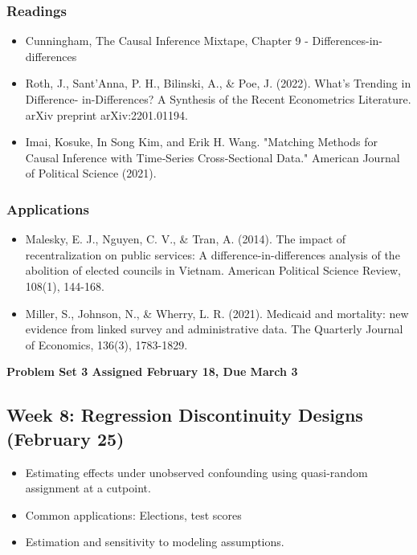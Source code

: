 \documentclass[11pt, article, oneside]{memoir}
\theoremstyle{Assumption}
\begin{document}
\subsubsection*{Readings}

\begin{itemize}
\item Cunningham, The Causal Inference Mixtape, Chapter 9 - Differences-in-differences
\item Roth, J., Sant'Anna, P. H., Bilinski, A., \& Poe, J. (2022). What's Trending in Difference- in-Differences? A Synthesis of the Recent Econometrics Literature. arXiv preprint arXiv:2201.01194.
\item Imai, Kosuke, In Song Kim, and Erik H. Wang. "Matching Methods for Causal Inference with Time‐Series Cross‐Sectional Data." American Journal of Political Science (2021).
\end{itemize}

\subsubsection*{Applications}

\begin{itemize}
\item Malesky, E. J., Nguyen, C. V., \& Tran, A. (2014). The impact of recentralization on public services: A difference-in-differences analysis of the abolition of elected councils in Vietnam. American Political Science Review, 108(1), 144-168.
\item Miller, S., Johnson, N., \& Wherry, L. R. (2021). Medicaid and mortality: new evidence from linked survey and administrative data. The Quarterly Journal of Economics, 136(3), 1783-1829.
\end{itemize}

\textbf{Problem Set 3  Assigned February 18, Due March 3}

\subsection{Week 8: Regression Discontinuity Designs (February 25)}

\begin{itemize}
\item Estimating effects under unobserved confounding using quasi-random assignment at a cutpoint.
\item Common applications: Elections, test scores
\item Estimation and sensitivity to modeling assumptions.
\end{itemize}
\end{document}
